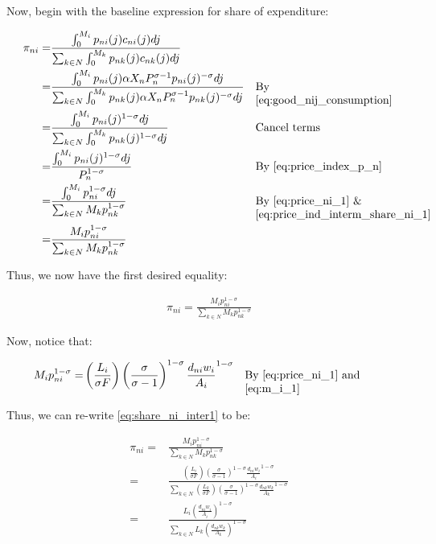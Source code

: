 \documentclass[10pt]{article}
\begin{document}
Now, begin with the baseline expression
for share of expenditure:

\begin{align}
    \pi_{n i}=&\frac{\int_0^{M_i} p_{n i}(j) c_{n i}(j) d j}{\sum_{k \in N} \int_0^{M_k} p_{n k}(j) c_{n k}(j) d j} \\
    = &\frac{\int_0^{M_i} p_{n i}(j) \alpha X_n P_n^{\sigma-1} p_{n i}(j)^{-\sigma} d j}{\sum_{k \in N} \int_0^{M_k} p_{n k}(j) \alpha X_n P_n^{\sigma-1} p_{n k}(j)^{-\sigma} d j} && \parbox[t]{4cm}{\raggedright By \eqref{eq:good_nij_consumption}} \\
    = &\frac{\int_0^{M_i} p_{ni}(j)^{1-\sigma} d j}{\sum_{k \in N} \int_0^{M_k} p_{nk}(j)^{1-\sigma} d j} && \parbox[t]{4cm}{\raggedright Cancel terms} \\
    = &\frac{\int_0^{M_i} p_{ni}(j)^{1-\sigma} d j}{P_n^{1-\sigma}} && \parbox[t]{4cm}{\raggedright By \eqref{eq:price_index_p_n}} \\
    = &\frac{\int_0^{M_i} p_{ni}^{1-\sigma} d j}{\sum_{k \in N} M_k p_{nk}^{1-\sigma}} && \parbox[t]{4cm}{\raggedright By \eqref{eq:price_ni_1} \& \eqref{eq:price_ind_interm_share_ni_1}} \\
    = &\frac{M_i p_{ni}^{1-\sigma}}{\sum_{k \in N} M_k p_{nk}^{1-\sigma}}
\end{align}

Thus, we now have the first desired equality:

\begin{align}
    \pi_{n i}=\frac{M_i p_{n i}^{1-\sigma}}{\sum_{k \in N} M_k p_{n k}^{1-\sigma}} \label{eq:share_ni_inter1}
\end{align}

Now, notice that:

\begin{align}
    M_i p_{ni}^{1-\sigma} = &\left(\frac{L_i}{\sigma F}\right) \left(\frac{\sigma}{\sigma-1}\right)^{1-\sigma} \frac{d_{ni} w_i}{A_i}^{1-\sigma} && \parbox[t]{4cm}{\raggedright By \eqref{eq:price_ni_1} and \eqref{eq:m_i_1}}
\end{align}

Thus, we can re-write \eqref{eq:share_ni_inter1} to be: 

\begin{align}
    \pi_{n i}=&\frac{M_i p_{n i}^{1-\sigma}}{\sum_{k \in N} M_k p_{n k}^{1-\sigma}} \\
    = &\frac{\left(\frac{L_i}{\sigma F}\right) \left(\frac{\sigma}{\sigma-1}\right)^{1-\sigma} \frac{d_{ni} w_i}{A_i}^{1-\sigma}}{\sum_{k \in N} \left(\frac{L_k}{\sigma F}\right) \left(\frac{\sigma}{\sigma-1}\right)^{1-\sigma} \frac{d_{nk} w_k}{A_k}^{1-\sigma}} \\
    = &\frac{L_i \left(\frac{d_{ni} w_i}{A_i}\right)^{1-\sigma}}{\sum_{k \in N} L_k \left(\frac{d_{nk} w_k}{A_k}\right)^{1-\sigma}}
\end{align}
\end{document}

